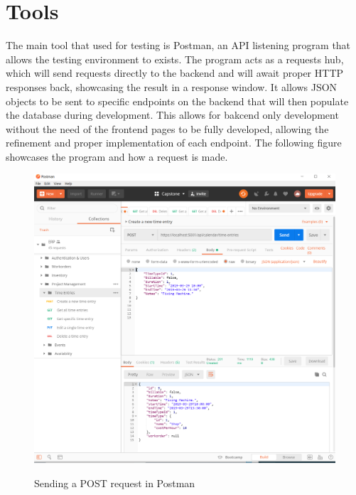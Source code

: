 {{{{{{\section{Tools}
The main tool that used for testing is Postman, an API listening program that allows the testing environment to exists. The program acts as a requests hub, which will send requests directly to the backend and will await proper HTTP responses back, showcasing the result in a response window. It allows JSON objects to be sent to specific endpoints on the backend that will then populate the database during development. This allows for bakcend only development without the need of the frontend pages to be fully developed, allowing the refinement and proper implementation of each endpoint. The following figure showcases the program and how a request is made. 
\begin{figure}[H]
	\centering
	\includegraphics[width=5in]{Postman.png}\\
	\caption{Sending a POST request in Postman}
	\label{fig:tobias}
\end{figure}


}}}}}}
